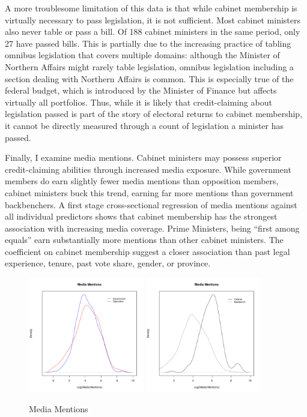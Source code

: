 \documentclass[letter,12pt]{article}
\begin{document}
A more troublesome limitation of this data is that while cabinet membership is virtually necessary to pass legislation, it is not sufficient. Most cabinet ministers also never table or pass a bill. Of 188 cabinet ministers in the same period, only 27 have passed bills. This is partially due to the increasing practice of tabling omnibus legislation that covers multiple domains: although the Minister of Northern Affairs might rarely table legislation, omnibus legislation including a section dealing with Northern Affairs is common. This is especially true of the federal budget, which is introduced by the Minister of Finance but affects virtually all portfolios. Thus, while it is likely that credit-claiming about legislation passed is part of the story of electoral returns to cabinet membership, it cannot be directly measured through a count of legislation a minister has passed.

Finally, I examine media mentions. Cabinet ministers may possess superior credit-claiming abilities through increased media exposure. While government members do earn slightly fewer media mentions than opposition members, cabinet ministers buck this trend, earning far more mentions than government backbenchers. A first stage cross-sectional regression of media mentions against all individual predictors shows that cabinet membership has the strongest association with increasing media coverage. Prime Ministers, being ``first among equals'' earn substantially more mentions than other cabinet ministers. The coefficient on cabinet membership suggest a closer association than past legal experience, tenure, past vote share, gender, or province.

\begin{figure}
\centering
\caption{Media Mentions}
\includegraphics[width=0.45\textwidth]{"Includes/media_govopp"}
\includegraphics[width=0.45\textwidth]{"Includes/media_cabinet"}
\end{figure}
\end{document}
